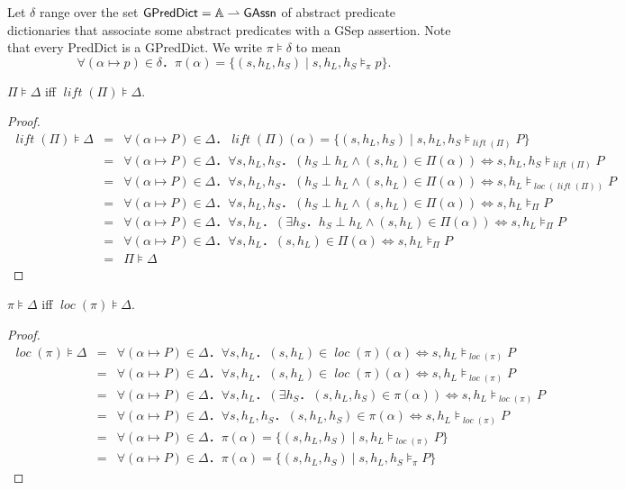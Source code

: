\documentclass[10pt]{article}
\newcommand{\loc}[1]{\mathop{\mathit{loc}}(#1)}
\newcommand{\sha}[1]{\mathop{\mathit{sha}}(#1)}
\newcommand{\lift}[1]{\mathop{\mathit{lift}}(#1)}
\begin{document}
Let $δ$ range over the set ${\sf GPredDict} = \mathbb{A} \rightharpoonup {\sf GAssn}$ of abstract predicate dictionaries that associate some abstract predicates with a GSep assertion. Note that every {\sf PredDict} is a {\sf GPredDict}. We write $π ⊧ δ$ to mean 
\[
∀(α↦p) ∈ δ．π(α) = \{(s,h_L,h_S) \mid s,h_L,h_S ⊧_π p\}.
\]
\begin{lemma}
$Π⊧Δ$ iff $\lift{Π} ⊧ Δ$.
\end{lemma}
\begin{proof}
\begin{eqnarray*}
\lift{Π} ⊧ Δ &=& ∀(α↦P) ∈ Δ．\lift{Π}(α) = \{(s,h_L,h_S)\mid s,h_L,h_S ⊧_{\lift{Π}} P\} \\
&=& ∀(α↦P) ∈ Δ．∀s,h_L,h_S．(h_S\perp h_L ∧ (s,h_L)∈Π(α)) ⇔ s,h_L,h_S ⊧_{\lift{Π}} P \\ 
&=& ∀(α↦P) ∈ Δ．∀s,h_L,h_S．(h_S\perp h_L ∧ (s,h_L)∈Π(α)) ⇔ s,h_L ⊧_{\loc{\lift{Π}}} P \\ 
&=& ∀(α↦P) ∈ Δ．∀s,h_L,h_S．(h_S\perp h_L ∧ (s,h_L)∈Π(α)) ⇔ s,h_L ⊧_Π P \\ 
&=& ∀(α↦P) ∈ Δ．∀s,h_L．(∃h_S．h_S\perp h_L ∧ (s,h_L)∈Π(α)) ⇔ s,h_L ⊧_Π P \\ 
&=& ∀(α↦P) ∈ Δ．∀s,h_L．(s,h_L)∈Π(α) ⇔ s,h_L ⊧_Π P \\ 
&=& Π ⊧ Δ 
\end{eqnarray*}
\end{proof}
\begin{lemma}
$π⊧Δ$ iff $\loc{π} ⊧ Δ$.
\end{lemma}
\begin{proof}
\begin{eqnarray*}
\loc{π} ⊧ Δ &=& ∀(α↦P) ∈ Δ．∀s,h_L．(s,h_L)∈\loc{π}(α) ⇔ s,h_L ⊧_{\loc{π}} P \\
&=& ∀(α↦P) ∈ Δ．∀s,h_L．(s,h_L)∈\loc{π}(α) ⇔ s,h_L ⊧_{\loc{π}} P \\
&=& ∀(α↦P) ∈ Δ．∀s,h_L．(∃h_S．(s,h_L,h_S) ∈ π(α)) ⇔ s,h_L ⊧_{\loc{π}} P \\
&=& ∀(α↦P) ∈ Δ．∀s,h_L,h_S．(s,h_L,h_S) ∈ π(α) ⇔ s,h_L ⊧_{\loc{π}} P \\
&=& ∀(α↦P) ∈ Δ．π(α) = \{(s,h_L,h_S)\mid s,h_L ⊧_{\loc{π}} P\} \\
&=& ∀(α↦P) ∈ Δ．π(α) = \{(s,h_L,h_S)\mid s,h_L,h_S ⊧_π P\}
\end{eqnarray*}
\end{proof}
\end{document}

